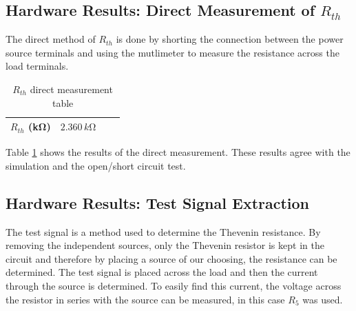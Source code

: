 \documentclass[11pt]{article}
\begin{document}
\subsection{Hardware Results: Direct Measurement of $R_{th}$}

The direct method of $R_{th}$ is done by shorting the connection between the power source terminals and using the mutlimeter to measure the resistance across the load terminals. \\

\begin{table}[h!]
	\centering
	\caption{$R_{th}$ direct measurement table}
	\label{Table:Lab3RthDirect}
	\begin{tabular}{|c|c|c|c|}
		\hline
		$R_{th}$ (\si{\kilo\ohm})& $2.360\,k\si\ohm$ \\
		\hline 
	\end{tabular}
\end{table}

Table \ref{Table:Lab3RthDirect} shows the results of the direct measurement. These results agree with the simulation and the open/short circuit test.

\subsection{Hardware Results:  Test Signal Extraction}

The test signal is a method used to determine the Thevenin resistance. By removing the independent sources, only the Thevenin resistor is kept in the circuit and therefore by placing a source of our choosing, the resistance can be determined. The test signal is placed across the load and then the current through the source is determined. To easily find this current, the voltage across the resistor in series with the source can be measured, in this case $R_5$ was used.
\end{document}
